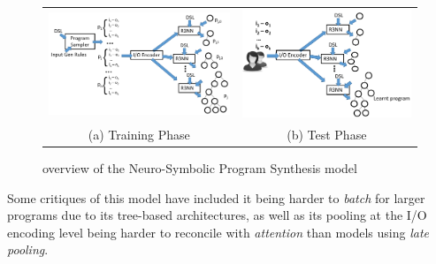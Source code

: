 \documentclass{article}
\begin{document}
\begin{figure}
    \begin{tabular}{c|c}
        \begin{minipage}{0.5\linewidth}
            \includegraphics[scale=0.3]{figures/nsps_training.pdf}
        \end{minipage}
        &
        \begin{minipage}{0.5\linewidth}
            \includegraphics[scale=0.3]{figures/nsps_test.pdf}
        \end{minipage}
        \\
        (a) Training Phase & (b) Test Phase
    \end{tabular}
    \caption{overview of the Neuro-Symbolic Program Synthesis model~\citep{nsps}}
    \label{nsps}
\end{figure}

Some critiques of this model have included it being harder to \emph{batch} for larger programs due to its tree-based architectures,
as well as its pooling at the I/O encoding level being harder to reconcile with \emph{attention} than models using \emph{late pooling}.~\citep{devlin2017robustfill}
\end{document}
